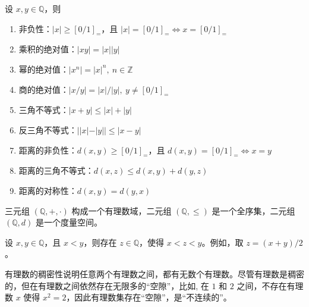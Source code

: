 \begin{theorem}[有理数绝对值的性质]
    设 $x,y\in\mathbb{Q}$，则
    \begin{enumerate}
        \item 非负性：$|x|\geq [0/1]_{=}$，且 $|x|=[0/1]_{=} \iff x=[0/1]_{=}$
        \item 乘积的绝对值：$|xy| = |x||y|$
        \item 幂的绝对值：$|x^n| = |x|^n,\ n\in\mathbb{Z}$
        \item 商的绝对值：$|x/y| = |x|/|y|,\ y\neq [0/1]_{=}$
        \item 三角不等式：$|x+y| \leq |x| + |y|$
        \item 反三角不等式：$||x| - |y|| \leq |x - y|$
        \item 距离的非负性：$d(x,y) \geq [0/1]_{=}$，且 $d(x,y)=[0/1]_{=} \iff x=y$
        \item 距离的三角不等式：$d(x,z) \leq d(x,y) + d(y,z)$
        \item 距离的对称性：$d(x,y) = d(y,x)$
    \end{enumerate}
\end{theorem}

\begin{note}
    三元组 $(\mathbb{Q},+,\cdot)$ 构成一个有理数域，二元组 $(\mathbb{Q},\leq)$ 是一个全序集，二元组 $(\mathbb{Q},d)$ 是一个度量空间。
\end{note}

\vspace{1em}

\begin{proposition}
    设 $x,y\in\mathbb{Q}$，且 $x<y$，则存在 $z\in\mathbb{Q}$，使得 $x<z<y$。例如，取 $z=(x+y)/2$。
\end{proposition}

\begin{note}
    有理数的稠密性说明任意两个有理数之间，都有无数个有理数。尽管有理数是稠密的，但在有理数之间依然存在无限多的“空隙”，比如, 在 $1$ 和 $2$ 之间，不存在有理数 $x$ 使得 $x^2=2$，因此有理数集存在“空隙”，是“不连续的”。
\end{note}
\vspace{1em}

\newpage